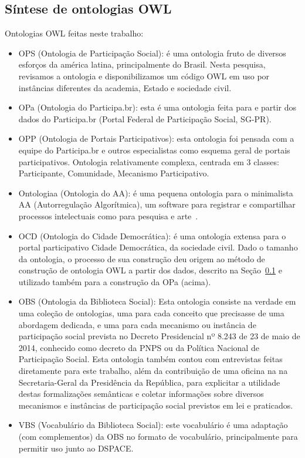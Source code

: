 \documentclass[a4paper,openright,12pt]{report} %
\begin{document}
\subsection{Síntese de ontologias OWL}
Ontologias OWL feitas neste trabalho:
\begin{itemize}
		\item OPS (Ontologia de Participação Social): é uma ontologia fruto de diversos esforços da américa latina, principalmente do Brasil. Nesta pesquisa, revisamos a ontologia e disponibilizamos um código OWL em uso por instâncias diferentes da academia, Estado e sociedade civil.
		\item OPa (Ontologia do Participa.br): esta é uma ontologia feita para e partir dos dados do Participa.br (Portal Federal de Participação Social, SG-PR).
		\item OPP (Ontologia de Portais Participativos): esta ontologia foi pensada com a equipe do Participa.br e outros especialistas como esquema geral de portais participativos. Ontologia relativamente complexa, centrada em 3 classes: Participante, Comunidade, Mecanismo Participativo.
		\item Ontologiaa (Ontologia do AA): é uma pequena ontologia para o minimalista AA (Autorregulação Algorítmica), um software para registrar e compartilhar processos intelectuais como para pesquisa e arte~\cite{paaper, ensaaio}.
		\item OCD (Ontologia do Cidade Democrática): é uma ontologia extensa para o portal participativo Cidade Democrática, da sociedade civil. Dado o tamanho da ontologia, o processo de sua construção deu origem ao método de construção de ontologia OWL a partir dos dados, descrito na Seção~\ref{} e utilizado também para a construção da OPa (acima).
		\item OBS (Ontologia da Biblioteca Social): Esta ontologia consiste na verdade em uma coleção de ontologias, uma para cada conceito que precisasse de uma abordagem dedicada, e uma para cada mecanismo ou instância de participação social prevista no Decreto Presidencial nº 8.243 de 23 de maio de 2014, conhecido como decreto da PNPS ou da Política Nacional de Participação Social. Esta ontologia também contou com entrevistas feitas diretamente para este trabalho, além da contribuição de uma oficina na na Secretaria-Geral da
Presidência da República, para explicitar a utilidade
destas formalizações semânticas e coletar informações sobre
diversos mecanismos e instâncias de participação social previstos
em lei e praticados.
		\item VBS (Vocabulário da Biblioteca Social): este
			vocabulário é uma adaptação (com complementos)
			da OBS no formato
			de vocabulário, principalmente para permitir
			uso junto ao DSPACE.
\end{itemize}
\end{document}
